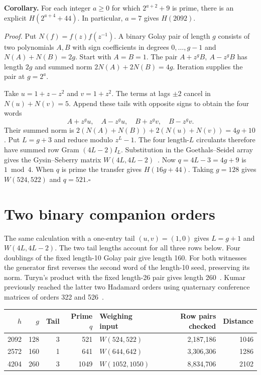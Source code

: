 \documentclass[10pt]{article}
\begin{document}
\medskip\noindent\textbf{Corollary.}
For each integer $a\ge0$ for which $2^{a+2}+9$ is prime, there is an explicit $H(2^{a+4}+44)$. In particular, $a=7$ gives $H(2092)$.

\smallskip\noindent\emph{Proof.}
Put $N(f)=f(z)f(z^{-1})$. A binary Golay pair of length $g$ consists of two polynomials $A,B$ with sign coefficients in degrees $0,\ldots,g-1$ and $N(A)+N(B)=2g$. Start with $A=B=1$. The pair $A+z^gB,\ A-z^gB$ has length $2g$ and summed norm $2N(A)+2N(B)=4g$. Iteration supplies the pair at $g=2^a$.

Take $u=1+z-z^2$ and $v=1+z^2$. The terms at lags $\pm2$ cancel in $N(u)+N(v)=5$. Append these tails with opposite signs to obtain the four words
\[
 A+z^gu,\quad A-z^gu,\quad B+z^gv,\quad B-z^gv .
\]
Their summed norm is $2(N(A)+N(B))+2(N(u)+N(v))=4g+10$. Put $L=g+3$ and reduce modulo $z^L-1$. The four length-$L$ circulants therefore have summed row Gram $(4L-2)I_L$. Substitution in the Goethals--Seidel array gives the Gysin--Seberry matrix $W(4L,4L-2)$~\cite[Theorem~7]{gs}. Now $q=4L-3=4g+9$ is $1\bmod4$. When $q$ is prime the transfer gives $H(16g+44)$. Taking $g=128$ gives $W(524,522)$ and $q=521$.\hfill$\square$

\newpage
\section*{Two binary companion orders}
The same calculation with a one-entry tail $(u,v)=(1,0)$ gives $L=g+1$ and $W(4L,4L-2)$. The two tail lengths account for all three rows below. Four doublings of the fixed length-10 Golay pair give length 160. For both witnesses the generator first reverses the second word of the length-10 seed, preserving its norm. Turyn's product with the fixed length-26 pair gives length 260~\cite{seeds}. Kumar previously reached the latter two Hadamard orders using quaternary conference matrices of orders 322 and 526~\cite{kumar}.

\begin{center}
\begin{tabular}{rrrrlrr}
\toprule
$h$ & $g$ & Tail & Prime $q$ & Weighing input & Row pairs checked & Distance\\
\midrule
2092 & 128 & 3 & 521  & $W(524,522)$   & 2,187,186 & 1046\\
2572 & 160 & 1 & 641  & $W(644,642)$   & 3,306,306 & 1286\\
4204 & 260 & 3 & 1049 & $W(1052,1050)$ & 8,834,706 & 2102\\
\bottomrule
\end{tabular}
\end{center}
\end{document}
